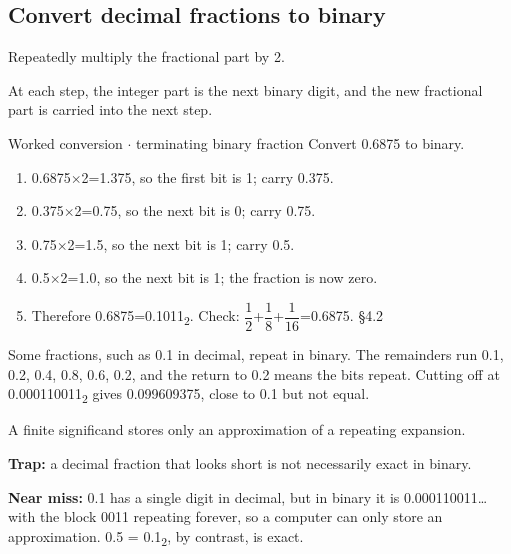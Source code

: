 \documentclass[11pt]{article}
\begin{document}
\begin{keepsection}
\begin{keepsection}
\subsection{Convert decimal fractions to binary}

Repeatedly multiply the fractional part by 2.

At each step, the integer part is the next binary digit, and the new fractional part is carried into the next step.

\begin{workedbox}{Worked conversion \ensuremath{\cdot} terminating binary fraction}
Convert 0.6875 to binary.

\begin{enumerate}
\item 0.6875\ensuremath{\times}2=1.375, so the first bit is 1; carry 0.375.
\item 0.375\ensuremath{\times}2=0.75, so the next bit is 0; carry 0.75.
\item 0.75\ensuremath{\times}2=1.5, so the next bit is 1; carry 0.5.
\item 0.5\ensuremath{\times}2=1.0, so the next bit is 1; the fraction is now zero.
\item Therefore 0.6875=0.1011\textsubscript{2}. Check: {\small\ensuremath{\dfrac{1}{2}}}+{\small\ensuremath{\dfrac{1}{8}}}+{\small\ensuremath{\dfrac{1}{16}}}=0.6875. \hfill{\small\color{FAUblue}§4.2}
\end{enumerate}
\end{workedbox}

Some fractions, such as 0.1 in decimal, repeat in binary. The remainders run 0.1, 0.2, 0.4, 0.8, 0.6, 0.2, and the return to 0.2 means the bits repeat. Cutting off at 0.000110011\textsubscript{2} gives 0.099609375, close to 0.1 but not equal.

A finite significand stores only an approximation of a repeating expansion.

\begin{notebox}\textbf{Trap:} a decimal fraction that looks short is not necessarily exact in binary.\end{notebox}

\begin{notebox}\textbf{Near miss:} 0.1 has a single digit in decimal, but in binary it is 0.000110011… with the block 0011 repeating forever, so a computer can only store an approximation. 0.5 = 0.1\textsubscript{2}, by contrast, is exact.\end{notebox}


\end{keepsection}
\end{keepsection}
\end{document}
